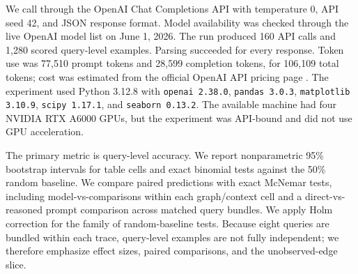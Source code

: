 We call \gptfourone through the OpenAI Chat Completions API with temperature 0, API seed 42, and JSON response format. Model availability was checked through the live OpenAI model list on June 1, 2026. The run produced 160 API calls and 1,280 scored query-level examples. Parsing succeeded for every response. Token use was 77,510 prompt tokens and 28,599 completion tokens, for 106,109 total tokens; cost was estimated from the official OpenAI API pricing page \cite{openai2026pricing}. The experiment used Python 3.12.8 with \texttt{openai 2.38.0}, \texttt{pandas 3.0.3}, \texttt{matplotlib 3.10.9}, \texttt{scipy 1.17.1}, and \texttt{seaborn 0.13.2}. The available machine had four NVIDIA RTX A6000 GPUs, but the experiment was API-bound and did not use GPU acceleration.

The primary metric is query-level accuracy. We report nonparametric 95\% bootstrap intervals for table cells and exact binomial tests against the 50\% random baseline. We compare paired predictions with exact McNemar tests, including model-vs-\observedbaseline comparisons within each graph/context cell and a direct-vs-reasoned prompt comparison across matched query bundles. We apply Holm correction for the family of random-baseline tests. Because eight queries are bundled within each trace, query-level examples are not fully independent; we therefore emphasize effect sizes, paired comparisons, and the unobserved-edge slice.
